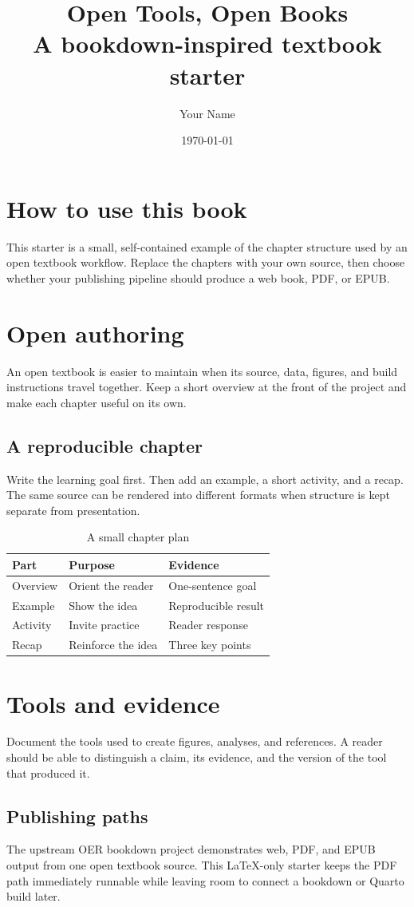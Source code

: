 \documentclass[11pt,oneside]{book}
\title{Open Tools, Open Books\\[0.4em]\large A bookdown-inspired textbook starter}
\author{Your Name}
\date{\today}
\begin{document}
\frontmatter
\maketitle
\chapter*{How to use this book}
This starter is a small, self-contained example of the chapter structure used by an open textbook workflow. Replace the chapters with your own source, then choose whether your publishing pipeline should produce a web book, PDF, or EPUB.
\tableofcontents
\mainmatter
\chapter{Open authoring}
An open textbook is easier to maintain when its source, data, figures, and build instructions travel together. Keep a short overview at the front of the project and make each chapter useful on its own.
\section{A reproducible chapter}
Write the learning goal first. Then add an example, a short activity, and a recap. The same source can be rendered into different formats when structure is kept separate from presentation.
\begin{table}[ht]
\centering
\caption{A small chapter plan}
\begin{tabular}{lll}
\toprule
Part & Purpose & Evidence \\
\midrule
Overview & Orient the reader & One-sentence goal \\
Example & Show the idea & Reproducible result \\
Activity & Invite practice & Reader response \\
Recap & Reinforce the idea & Three key points \\
\bottomrule
\end{tabular}
\end{table}
\chapter{Tools and evidence}
Document the tools used to create figures, analyses, and references. A reader should be able to distinguish a claim, its evidence, and the version of the tool that produced it.
\section{Publishing paths}
The upstream OER bookdown project demonstrates web, PDF, and EPUB output from one open textbook source. This LaTeX-only starter keeps the PDF path immediately runnable while leaving room to connect a bookdown or Quarto build later.
\end{document}
